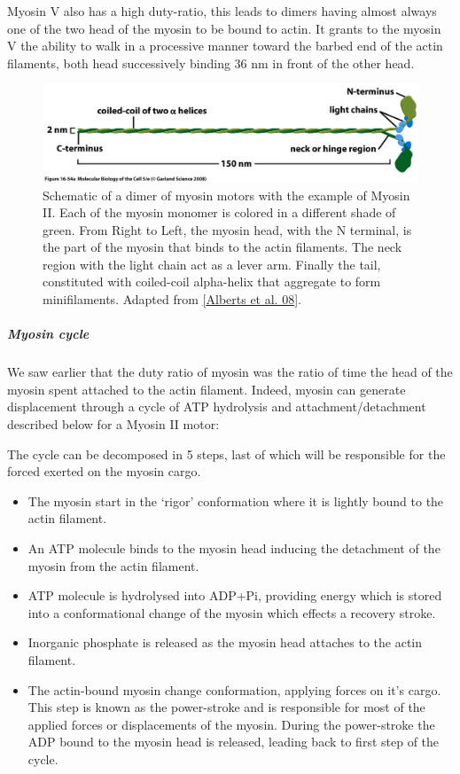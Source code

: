 \documentclass[A4paperpaper,11pt,english]{sphinxmanual}
\begin{document}
Myosin V also has a high duty-ratio, this leads to dimers having almost always
one of the two head of the myosin to be bound to actin. It grants to the myosin
V the ability to walk in a processive manner toward the barbed end of
the actin filaments, both head successively binding 36 nm in front of the other
head.
\begin{figure}[htbp]
\centering
\capstart

\includegraphics[width=0.700\linewidth]{figure-16-54a.jpg}
\caption{Schematic of a dimer of myosin motors with the example of Myosin II.
Each of the myosin monomer is colored in a
different shade of green. From Right to Left, the myosin head, with the N
terminal, is the part of the myosin that binds to the actin filaments. The
neck region with the light chain act as a lever arm. Finally the tail,
constituted with coiled-coil alpha-helix that aggregate to form minifilaments.
Adapted from {\hyperref[parts/part1:alberts2008]{{[}Alberts et al. 08{]}}}.}\label{parts/part1:fig-myosin}\end{figure}


\subparagraph{Myosin cycle}
\label{parts/part1:myosin-cycle}
We saw earlier that the duty ratio of myosin was the ratio of time the head of
the myosin spent attached to the actin filament. Indeed, myosin can generate
displacement through a cycle of ATP hydrolysis and attachment/detachment
described below for a Myosin II motor:

The cycle can be decomposed in 5 steps, last of which will be responsible for
the forced exerted on the myosin cargo.
\begin{itemize}
\item {} 
The myosin start in the `rigor' conformation where it is lightly bound to
the actin filament.

\item {} 
An ATP molecule binds to the myosin head inducing the detachment of the
myosin from the actin filament.

\item {} 
ATP molecule is hydrolysed into ADP+Pi, providing energy which is stored
into a conformational change of the myosin which effects a recovery
stroke.

\item {} 
Inorganic phosphate is released as the myosin head attaches to the actin
filament.

\item {} 
The actin-bound myosin change conformation, applying forces on it's
cargo. This step is known as the power-stroke and is responsible for most
of the applied forces or displacements of the myosin. During the
power-stroke the ADP bound to the myosin head is released, leading back
to first step of the cycle.

\end{itemize}
\end{document}
